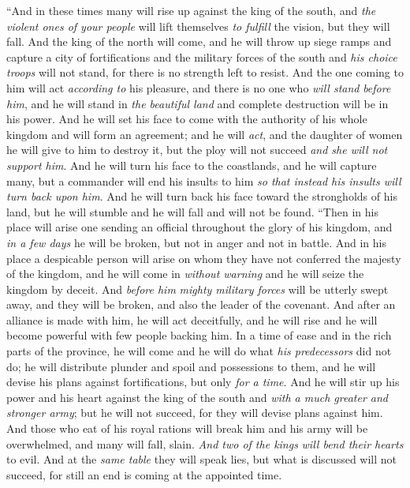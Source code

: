 \begin{biblechapter}
\verse “And in these times many will rise up against the king of the south, and \textit{the violent ones of your people} will lift themselves \textit{to fulfill} the vision, but they will fall.
\verse And the king of the north will come, and he will throw up siege ramps and capture a city of fortifications and the military forces of the south and \textit{his choice troops} will not stand, for there is no strength left to resist.
\verse And the one coming to him will act \textit{according to} his pleasure, and there is no one who \textit{will stand} \textit{before him}, and he will stand in \textit{the beautiful land} and complete destruction will be in his power.
\verse And he will set his face to come with the authority of his whole kingdom and will form an agreement; and he will \textit{act}, and the daughter of women he will give to him to destroy it, but the ploy will not succeed \textit{and she will not support him}.
\verse And he will turn his face to the coastlands, and he will capture many, but a commander will end his insults to him \textit{so that instead his insults will turn back upon him}.
\verse And he will turn back his face toward the strongholds of his land, but he will stumble and he will fall and will not be found.
\verse “Then in his place will arise one sending an official throughout the glory of his kingdom, and \textit{in a few days} he will be broken, but not in anger and not in battle.
\verse And in his place a despicable person will arise on whom they have not conferred the majesty of the kingdom, and he will come in \textit{without warning} and he will seize the kingdom by deceit.
\verse And \textit{before him} \textit{mighty military forces} will be utterly swept away, and they will be broken, and also the leader of the covenant.
\verse And after an alliance is made with him, he will act deceitfully, and he will rise and he will become powerful with few people backing him.
\verse In a time of ease and in the rich parts of the province, he will come and he will do what \textit{his predecessors} did not do; he will distribute plunder and spoil and possessions to them, and he will devise his plans against fortifications, but only \textit{for a time}.
\verse And he will stir up his power and his heart against the king of the south and \textit{with a much greater and stronger army}; but he will not succeed, for they will devise plans against him.
\verse And those who eat of his royal rations will break him and his army will be overwhelmed, and many will fall, slain.
\verse \textit{And two of the kings} \textit{will bend their hearts} to evil. And at the \textit{same table} they will speak lies, but what is discussed will not succeed, for still an end is coming at the appointed time.

\end{biblechapter}
